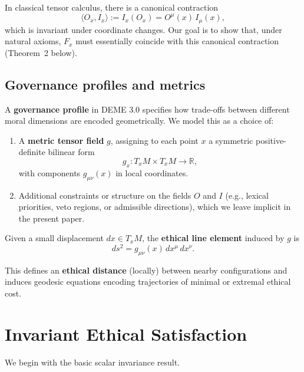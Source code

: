 \documentclass[12pt]{article}
\theoremstyle{remark}
\begin{document}
In classical tensor calculus, there is a canonical contraction
\begin{equation}
    \langle O_x, I_x \rangle := I_x(O_x) = O^\mu(x)\, I_\mu(x),
\end{equation}
which is invariant under coordinate changes. Our goal is to show that, under natural axioms, $F_x$ must essentially coincide with this canonical contraction (Theorem~2 below).

\subsection{Governance profiles and metrics}

A \textbf{governance profile} in DEME 3.0 specifies how trade-offs between different moral dimensions are encoded geometrically. We model this as a choice of:

\begin{enumerate}
    \item A \textbf{metric tensor field} $g$, assigning to each point $x$ a symmetric positive-definite bilinear form
    \begin{equation}
        g_x\colon T_x M \times T_x M \to \mathbb{R},
    \end{equation}
    with components $g_{\mu\nu}(x)$ in local coordinates.

    \item Additional constraints or structure on the fields $O$ and $I$ (e.g., lexical priorities, veto regions, or admissible directions), which we leave implicit in the present paper.
\end{enumerate}

Given a small displacement $dx \in T_x M$, the \textbf{ethical line element} induced by $g$ is
\begin{equation}
    ds^2 = g_{\mu\nu}(x)\, dx^\mu\, dx^\nu.
\end{equation}

This defines an \textbf{ethical distance} (locally) between nearby configurations and induces geodesic equations encoding trajectories of minimal or extremal ethical cost.

\section{Invariant Ethical Satisfaction}

We begin with the basic scalar invariance result.
\end{document}
